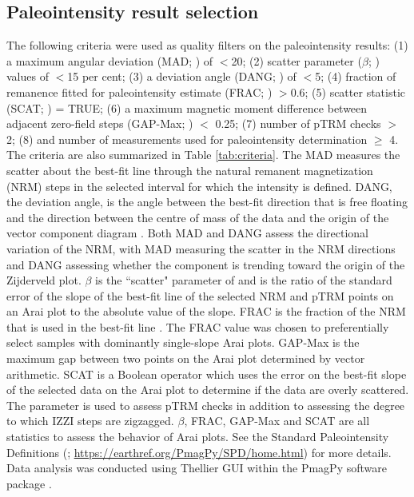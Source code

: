 \documentclass[9pt,twocolumn,twoside,lineno]{pnas-new}
\begin{document}
{%

\subsection*{Paleointensity result selection}
The following criteria were used as quality filters on the paleointensity results: (1) a maximum angular deviation (MAD; \cite{Kirschvink1980a}) of $<$20\textdegree; (2) scatter parameter ($\beta$; \cite{Coe1978a}) values of $<$15 per cent; (3) a deviation angle (DANG; \cite{Tauxe2004a}) of $<$5\textdegree; (4) fraction of remanence fitted for paleointensity estimate (FRAC; \cite{Shaar2013a}) $>$0.6; (5) scatter statistic (SCAT; \cite{Shaar2013a}) = TRUE; (6) a maximum magnetic moment difference between adjacent zero-field steps (GAP-Max; \cite{Shaar2013a}) $<$ 0.25; (7) number of pTRM checks $>$ 2; (8) and number of measurements used for paleointensity determination $\geq$ 4. The criteria are also summarized in Table \ref{tab:criteria}. The MAD measures the scatter about the best-fit line through the natural remanent magnetization (NRM) steps in the selected interval for which the intensity is defined. DANG, the deviation angle, is the angle between the best-fit direction that is free floating and the direction between the centre of mass of the data and the origin of the vector component diagram \cite{Tauxe2004a}. Both MAD and DANG assess the directional variation of the NRM, with MAD measuring the scatter in the NRM directions and DANG assessing whether the component is trending toward the origin of the Zijderveld plot. $\beta$ is the ``scatter" parameter of \cite{Coe1978a} and is the ratio of the standard error of the slope of the best-fit line of the selected NRM and pTRM points on an Arai plot to the absolute value of the slope. FRAC is the fraction of the NRM that is used in the best-fit line \cite{Shaar2013a}. The FRAC value was chosen to preferentially select samples with dominantly single-slope Arai plots. GAP-Max is the maximum gap between two points on the Arai plot determined by vector arithmetic. SCAT is a Boolean operator which uses the error on the best-fit slope of the selected data on the Arai plot to determine if the data are overly scattered. The parameter is used to assess pTRM checks in addition to assessing the degree to which IZZI steps are zigzagged. $\beta$, FRAC, GAP-Max and SCAT are all statistics to assess the behavior of Arai plots. See the Standard Paleointensity Definitions (\cite{Paterson2014a}; \url{https://earthref.org/PmagPy/SPD/home.html}) for more details. Data analysis was conducted using Thellier GUI \cite{Shaar2013a} within the PmagPy software package \cite{Tauxe2016a}.

}
\end{document}
